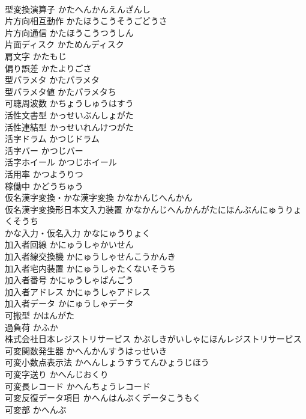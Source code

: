 \documentclass[8pt]{extreport}
\begin{document}
\begin{CJK}{UTF8}{min}
\\	型変換演算子	かたへんかんえんざんし	
\\	片方向相互動作	かたほうこうそうごどうさ	
\\	片方向通信	かたほうこうつうしん	
\\	片面ディスク	かためんディスク	
\\	肩文字	かたもじ	
\\	偏り誤差	かたよりごさ	
\\	型パラメタ	かたパラメタ	
\\	型パラメタ値	かたパラメタち	
\\	可聴周波数	かちょうしゅうはすう	
\\	活性文書型	かっせいぶんしょがた	
\\	活性連結型	かっせいれんけつがた	
\\	活字ドラム	かつじドラム	
\\	活字バー	かつじバー	
\\	活字ホイール	かつじホイール	
\\	活用率	かつようりつ	
\\	稼働中	かどうちゅう	
\\	仮名漢字変換・かな漢字変換	かなかんじへんかん	
\\	仮名漢字変換形日本文入力装置	かなかんじへんかんがたにほんぶんにゅうりょくそうち	
\\	かな入力・仮名入力	かなにゅうりょく	
\\	加入者回線	かにゅうしゃかいせん	
\\	加入者線交換機	かにゅうしゃせんこうかんき	
\\	加入者宅内装置	かにゅうしゃたくないそうち	
\\	加入者番号	かにゅうしゃばんごう	
\\	加入者アドレス	かにゅうしゃアドレス	
\\	加入者データ	かにゅうしゃデータ	
\\	可搬型	かはんがた	
\\	過負荷	かふか	
\\	株式会社日本レジストリサービス	かぶしきがいしゃにほんレジストリサービス	
\\	可変関数発生器	かへんかんすうはっせいき	
\\	可変小数点表示法	かへんしょうすうてんひょうじほう	
\\	可変字送り	かへんじおくり	
\\	可変長レコード	かへんちょうレコード	
\\	可変反復データ項目	かへんはんぷくデータこうもく	
\\	可変部	かへんぶ	

\end{CJK}
\end{document}
